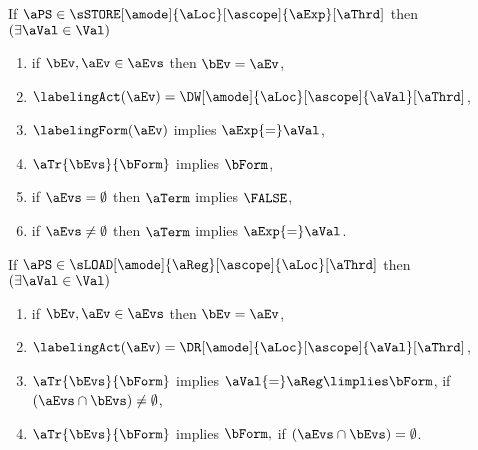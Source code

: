 \begin{definition}
  \begin{multicols}{2}
    If $\aPS \in \sSTORE[\amode]{\aLoc}[\ascope]{\aExp}[\aThrd]$ then
    $(\exists\aVal\in\Val)$
    \begin{enumerate}[topsep=0pt]
    \item
     if $\bEv,\aEv\in\aEvs$ then $\bEv=\aEv$,
    \item
      $\labelingAct(\aEv) = \DW[\amode]{\aLoc}[\ascope]{\aVal}[\aThrd]$,
    \item
      $\labelingForm(\aEv)$ implies
      \begin{math}
        \aExp{=}\aVal
      \end{math},    
    \item
      $\aTr{\bEvs}{\bForm}$ implies 
      \begin{math}
        \bForm
      \end{math},
    \item%
      if $\aEvs=\emptyset$ then $\aTerm$ implies $\FALSE$,
    \item 
      if $\aEvs\neq\emptyset$ then $\aTerm$ implies $\aExp{=}\aVal$.
    \end{enumerate}
    \columnbreak
    If $\aPS \in \sLOAD[\amode]{\aReg}[\ascope]{\aLoc}[\aThrd]$ then
    $(\exists\aVal\in\Val)$
    \begin{enumerate}[topsep=0pt]
    \item
      if $\bEv,\aEv\in\aEvs$ then $\bEv=\aEv$,
    \item
      $\labelingAct(\aEv) = \DR[\amode]{\aLoc}[\ascope]{\aVal}[\aThrd]$,
    \item
      $\aTr{\bEvs}{\bForm}$ implies
      \begin{math}
        \aVal{=}\aReg
        \limplies \bForm
      \end{math},    
      if $(\aEvs\cap\bEvs)\neq\emptyset$,
    \item
      $\aTr{\bEvs}{\bForm}$ implies
      \begin{math}
        \bForm,
      \end{math}
      if $(\aEvs\cap\bEvs)=\emptyset$.
    \end{enumerate}

\end{multicols}
\end{definition}
